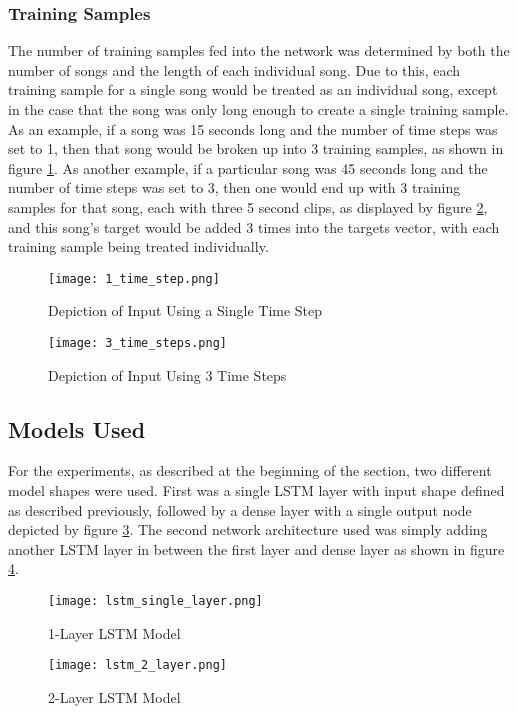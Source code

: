         \subsubsection{Training Samples}
        The number of training samples fed into the network was determined by both the number of songs and the length of each individual song. Due to this, each training sample for a single song would be treated as an individual song, except in the case that the song was only long enough to create a single training sample. As an example, if a song was 15 seconds long and the number of time steps was set to 1, then that song would be broken up into 3 training samples, as shown in figure \ref{fig:time-1}. As another example, if a particular song was 45 seconds long and the number of time steps was set to 3, then one would end up with 3 training samples for that song, each with three 5 second clips, as displayed by figure \ref{fig:time-3}, and this song's target would be added 3 times into the targets vector, with each training sample being treated individually.
            \begin{figure}
                \texttt{[image: 1\_time\_step.png]}
                \caption{Depiction of Input Using a Single Time Step}
                \label{fig:time-1}
            \end{figure}
            \begin{figure}
                \texttt{[image: 3\_time\_steps.png]}
                \caption{Depiction of Input Using 3 Time Steps}
                \label{fig:time-3}
            \end{figure}
            
    \subsection{Models Used}
    For the experiments, as described at the beginning of the section, two different model shapes were used. First was a single LSTM layer with input shape defined as described previously, followed by a dense layer with a single output node depicted by figure \ref{fig:lstm-1}. The second network architecture used was simply adding another LSTM layer in between the first layer and dense layer as shown in figure \ref{fig:lstm-2}.
            \begin{figure}
                \texttt{[image: lstm\_single\_layer.png]}
                \caption{1-Layer LSTM Model}
                \label{fig:lstm-1}
            \end{figure}
            \begin{figure}
                \texttt{[image: lstm\_2\_layer.png]}
                \caption{2-Layer LSTM Model}
                \label{fig:lstm-2}
            \end{figure}
